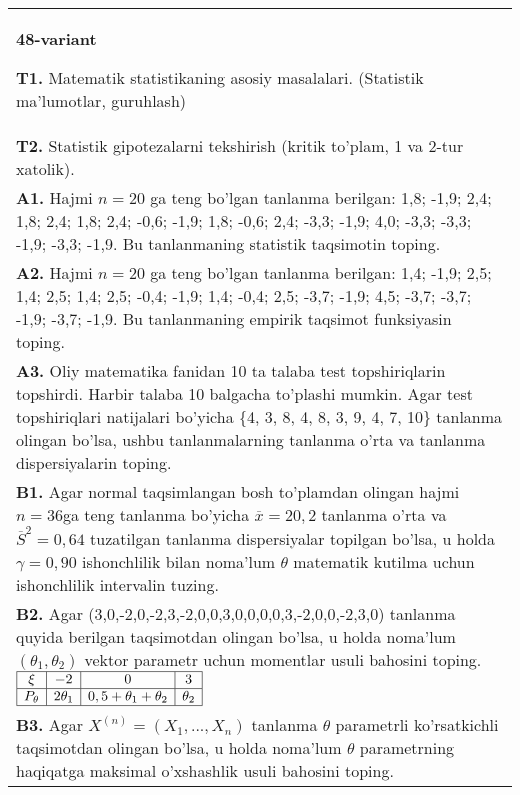 \documentclass{article}
\begin{document}
\begin{tabular}{m{17cm}}
\textbf{48-variant}
\newline

\textbf{T1.} Matematik statistikaning asosiy masalalari. (Statistik ma'lumotlar, guruhlash)
\\
\textbf{T2.} 
Statistik gipotezalarni tekshirish (kritik to'plam, 1 va 2-tur xatolik).
\\
\textbf{A1.} 
Hajmi \(n = 20\) ga teng bo'lgan tanlanma berilgan: 1,8; -1,9; 2,4; 1,8; 2,4; 1,8; 2,4; -0,6; -1,9; 1,8; -0,6; 2,4; -3,3; -1,9; 4,0; -3,3; -3,3; -1,9; -3,3; -1,9. Bu tanlanmaning statistik taqsimotin toping.
\\
\textbf{A2.} 
Hajmi \(n = 20\) ga teng bo'lgan tanlanma berilgan: 1,4; -1,9; 2,5; 1,4; 2,5; 1,4; 2,5; -0,4; -1,9; 1,4; -0,4; 2,5; -3,7; -1,9; 4,5; -3,7; -3,7; -1,9; -3,7; -1,9. Bu tanlanmaning empirik taqsimot funksiyasin toping.
\\
\textbf{A3.} 
Oliy matematika fanidan 10 ta talaba test topshiriqlarin topshirdi. Harbir talaba 10 balgacha to'plashi mumkin. Agar test topshiriqlari natijalari bo'yicha \{4, 3, 8, 4, 8, 3, 9, 4, 7, 10\} tanlanma olingan bo'lsa, ushbu tanlanmalarning tanlanma o'rta va tanlanma dispersiyalarin toping.
\\
\textbf{B1.} 
Agar normal taqsimlangan bosh to'plamdan olingan hajmi \(n = 36\)ga teng tanlanma bo'yicha \(\overline{x} = 20,2\) tanlanma o'rta va \({\overline{S}}^{2} = 0,64\) tuzatilgan tanlanma dispersiyalar topilgan bo'lsa, u holda \(\gamma = 0,90\) ishonchlilik bilan noma'lum \(\theta\) matematik kutilma uchun ishonchlilik intervalin tuzing.
\\
\textbf{B2.} 
Agar (3,0,-2,0,-2,3,-2,0,0,3,0,0,0,0,3,-2,0,0,-2,3,0) tanlanma quyida berilgan taqsimotdan olingan bo'lsa, u holda noma'lum \(\left( \theta_{1},\theta_{2} \right)\) vektor parametr uchun momentlar usuli bahosini toping.
$\begin{array}{|c|c|c|c|}
    \hline
    \xi & - 2 & 0 & 3 \\
    \hline
    P_{\theta} & 2\theta_{1} & 0,5 + \theta_{1} + \theta_{2} & \theta_{2} \\
    \hline
\end{array}$
\\
\textbf{B3.} 
Agar \(X^{(n)} = \left( X_{1},...,X_{n} \right)\) tanlanma \(\theta\) parametrli ko'rsatkichli taqsimotdan olingan bo'lsa, u holda noma'lum \(\theta\) parametrning haqiqatga maksimal o'xshashlik usuli bahosini toping.
\\

\end{tabular}
\end{document}
